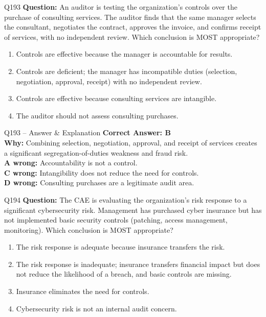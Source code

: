 \documentclass[aspectratio=169,10pt]{beamer}
\begin{document}
	\begin{frame}[t]{Q193}
		\small
		\textbf{Question:} An auditor is testing the organization's controls over the purchase of consulting services. The auditor finds that the same manager selects the consultant, negotiates the contract, approves the invoice, and confirms receipt of services, with no independent review. Which conclusion is MOST appropriate?
		\begin{enumerate}[label=\Alph*.,itemsep=1pt,topsep=2pt]
			\item Controls are effective because the manager is accountable for results.
			\item Controls are deficient; the manager has incompatible duties (selection, negotiation, approval, receipt) with no independent review.
			\item Controls are effective because consulting services are intangible.
			\item The auditor should not assess consulting purchases.
		\end{enumerate}
	\end{frame}
	
	\begin{frame}[t]{Q193 -- Answer \& Explanation}
		\small
		\textbf{Correct Answer: B} \\[4pt]
		\textbf{Why:} Combining selection, negotiation, approval, and receipt of services creates a significant segregation-of-duties weakness and fraud risk. \\[4pt]
		\textbf{A wrong:} Accountability is not a control. \\[2pt]
		\textbf{C wrong:} Intangibility does not reduce the need for controls. \\[2pt]
		\textbf{D wrong:} Consulting purchases are a legitimate audit area.
	\end{frame}
	
	\begin{frame}[t]{Q194}
		\small
		\textbf{Question:} The CAE is evaluating the organization's risk response to a significant cybersecurity risk. Management has purchased cyber insurance but has not implemented basic security controls (patching, access management, monitoring). Which conclusion is MOST appropriate?
		\begin{enumerate}[label=\Alph*.,itemsep=1pt,topsep=2pt]
			\item The risk response is adequate because insurance transfers the risk.
			\item The risk response is inadequate; insurance transfers financial impact but does not reduce the likelihood of a breach, and basic controls are missing.
			\item Insurance eliminates the need for controls.
			\item Cybersecurity risk is not an internal audit concern.
		\end{enumerate}
	\end{frame}
	
\end{document}
